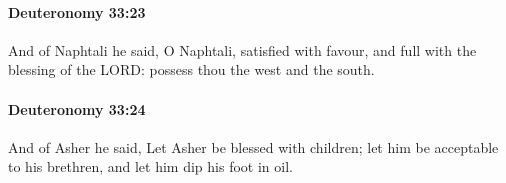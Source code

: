 		\paragraph{Deuteronomy 33:23} %
			\label{DEUTERONOMY-33-23}

			And of Naphtali he said, O Naphtali, satisfied with favour, and full with the blessing of the LORD: possess thou the west and the south.


		\paragraph{Deuteronomy 33:24} %
			\label{DEUTERONOMY-33-24}

			And of Asher he said, Let Asher be blessed with children; let him be acceptable to his brethren, and let him dip his foot in oil.



